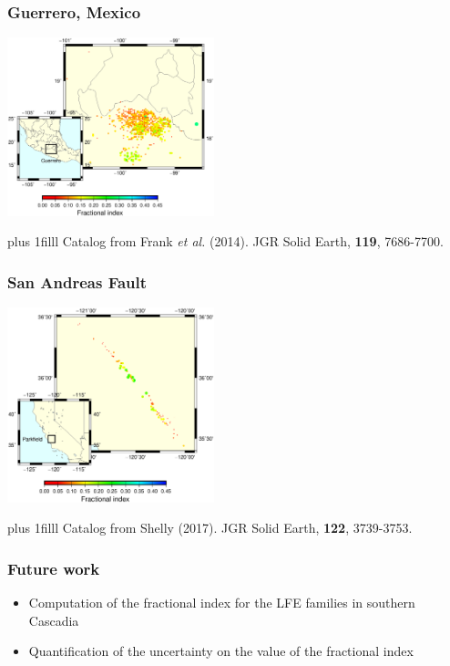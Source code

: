 \documentclass{beamer}
\newcommand{\btVFill}{\vskip0pt plus 1filll}
\begin{document}
	\begin{frame}
		\frametitle{Guerrero, Mexico}
		\begin{center}
			\includegraphics[width=6cm, trim={1cm 0cm 2cm 13cm}, clip]{longrange/guerrero_d.eps}
		\end{center}
		\btVFill
		\tiny{Catalog from Frank \textit{et al.} (2014). JGR Solid Earth, \textbf{119}, 7686-7700.}
	\end{frame}

	\begin{frame}
		\frametitle{San Andreas Fault}
		\begin{center}
			\includegraphics[width=6cm, trim={1cm 0cm 3cm 13cm}, clip]{longrange/sanandreas_d.eps}
		\end{center}
		\btVFill
		\tiny{Catalog from Shelly (2017). JGR Solid Earth, \textbf{122}, 3739-3753.}
	\end{frame}

	\begin{frame}
		\frametitle{Future work}
		\begin{itemize}
			\item Computation of the fractional index for the LFE families in southern Cascadia
			\item Quantification of the uncertainty on the value of the fractional index
		\end{itemize}
	\end{frame}

\end{document}
